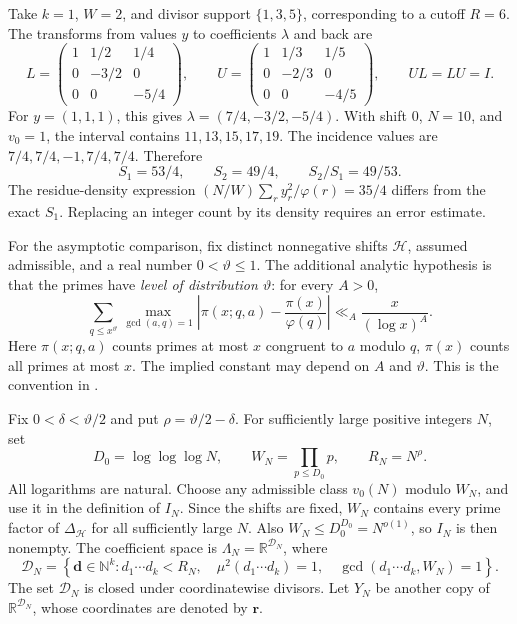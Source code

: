 \documentclass[11pt]{article}
\begin{document}
\begin{example}
Take\label{ex:mobius} $k=1$, $W=2$, and divisor support $\{1,3,5\}$, corresponding to a
cutoff $R=6$.  The transforms from values $y$ to coefficients $\lambda$
and back are
\[
 L=\begin{pmatrix}1&1/2&1/4\\0&-3/2&0\\0&0&-5/4\end{pmatrix},
 \qquad
 U=\begin{pmatrix}1&1/3&1/5\\0&-2/3&0\\0&0&-4/5\end{pmatrix},
 \qquad UL=LU=I.
\]
For $y=(1,1,1)$, this gives $\lambda=(7/4,-3/2,-5/4)$.
With shift $0$, $N=10$, and $v_0=1$, the interval contains
$11,13,15,17,19$.  The incidence values are
$7/4,7/4,-1,7/4,7/4$.  Therefore
\[
             S_1=53/4,\qquad S_2=49/4,\qquad S_2/S_1=49/53.
\]
The residue-density expression $(N/W)\sum_r y_r^2/\varphi(r)=35/4$
differs from the exact $S_1$.  Replacing an integer count by its density
requires an error estimate.
\end{example}

For the asymptotic comparison, fix distinct nonnegative shifts
$\mathcal H$, assumed admissible, and a real number $0<\vartheta\leq1$.
The additional analytic hypothesis is that the primes have
\emph{level of distribution $\vartheta$}: for every $A>0$,
\begin{equation}\label{eq:lod}
 \sum_{q\leq x^\vartheta}\max_{\gcd(a,q)=1}
 \left|\pi(x;q,a)-\frac{\pi(x)}{\varphi(q)}\right|
       \ll_A\frac{x}{(\log x)^A}.
\end{equation}
Here $\pi(x;q,a)$ counts primes at most $x$ congruent to $a$ modulo $q$,
$\pi(x)$ counts all primes at most $x$.
The implied constant may depend on $A$ and $\vartheta$.
This is the convention in \cite[(1.3), p.~384]{Maynard}.

Fix $0<\delta<\vartheta/2$ and put $\rho=\vartheta/2-\delta$.
For sufficiently large positive integers $N$, set
\[
 D_0=\log\log\log N,\qquad W_N=\prod_{p\leq D_0}p,
 \qquad R_N=N^\rho.
\]
All logarithms are natural.  Choose any admissible class $v_0(N)$
modulo $W_N$, and use it in the definition of $I_N$.
Since the shifts are fixed, $W_N$ contains every prime factor of
$\Delta_{\mathcal H}$ for all sufficiently large $N$.
Also $W_N\leq D_0^{D_0}=N^{o(1)}$, so $I_N$ is then nonempty.
The coefficient space is $\Lambda_N=\mathbb R^{\mathcal D_N}$, where
\[
 \mathcal D_N=\left\{\boldsymbol d\in\mathbb N^k:
 d_1\cdots d_k<R_N,\quad
 \mu^2(d_1\cdots d_k)=1,\quad
 \gcd(d_1\cdots d_k,W_N)=1\right\}.
\]
The set $\mathcal D_N$ is closed under coordinatewise divisors.
Let $Y_N$ be another copy of $\mathbb R^{\mathcal D_N}$, whose coordinates
are denoted by $\boldsymbol r$.
\end{document}
